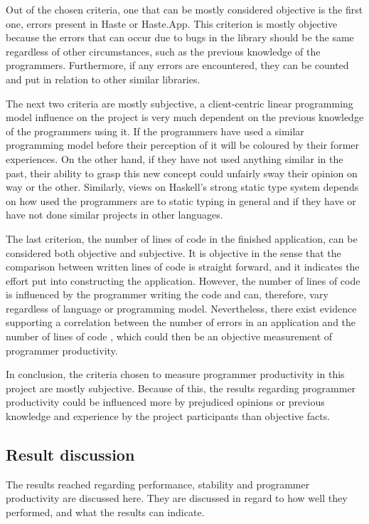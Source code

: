 \documentclass[a4paper]{article}
\begin{document}
Out of the chosen criteria, one that can be mostly considered objective is the first one, errors present in Haste or Haste.App. This criterion is mostly objective because the errors that can occur due to bugs in the library should be the same regardless of other circumstances, such as the previous knowledge of the programmers. Furthermore, if any errors are encountered, they can be counted and put in relation to other similar libraries.

The next two criteria are mostly subjective, a client-centric linear programming model influence on the project is very much dependent on the previous knowledge of the programmers using it. If the programmers have used a similar programming model before their perception of it will be coloured by their former experiences. On the other hand, if they have not used anything similar in the past, their ability to grasp this new concept could unfairly sway their opinion on way or the other. Similarly, views on Haskell's strong static type system depends on how used the programmers are to static typing in general and if they have or have not done similar projects in other languages.

The last criterion, the number of lines of code in the finished application, can be considered both objective and subjective. It is objective in the sense that the comparison between written lines of code is straight forward, and it indicates the effort put into constructing the application. However, the number of lines of code is influenced by the programmer writing the code and can, therefore, vary regardless of language or programming model. Nevertheless, there exist evidence supporting a correlation between the number of errors in an application and the number of lines of code \cite{mcconnell2004code}, which could then be an objective measurement of programmer productivity.

In conclusion, the criteria chosen to measure programmer productivity in this project are mostly subjective. Because of this, the results regarding programmer productivity could be influenced more by prejudiced opinions or previous knowledge and experience by the project participants than objective facts.

\subsection{Result discussion}
The results reached regarding performance, stability and programmer productivity are discussed here. They are discussed in regard to how well they performed, and what the results can indicate.
\end{document}
